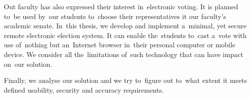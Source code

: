 Out faculty has also expressed their interest in~electronic voting. It is planned to~be used by~our students to~choose their representatives it our faculty's academic senate. In~this thesis, we develop and implement a~minimal, yet secure remote electronic election system. It can enable the~students to~cast a~vote with use of~nothing but an~Internet browser in~their personal computer or mobile device. We consider all the~limitations of~such technology that can have impact on~our solution. 

Finally, we analyse our solution and we try to~figure out to~what extent it meets defined usability, security and accuracy requirements.